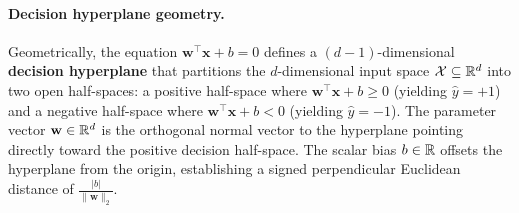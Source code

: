 \paragraph{Decision hyperplane geometry.}
Geometrically, the equation $\mathbf{w}^\top \mathbf{x} + b = 0$ defines a $(d-1)$-dimensional \textbf{decision hyperplane} that partitions the $d$-dimensional input space $\mathcal{X} \subseteq \mathbb{R}^d$ into two open half-spaces: a positive half-space where $\mathbf{w}^\top \mathbf{x} + b \ge 0$ (yielding $\hat{y} = +1$) and a negative half-space where $\mathbf{w}^\top \mathbf{x} + b < 0$ (yielding $\hat{y} = -1$). The parameter vector $\mathbf{w} \in \mathbb{R}^d$ is the orthogonal normal vector to the hyperplane pointing directly toward the positive decision half-space. The scalar bias $b \in \mathbb{R}$ offsets the hyperplane from the origin, establishing a signed perpendicular Euclidean distance of $\frac{|b|}{\|\mathbf{w}\|_2}$.

